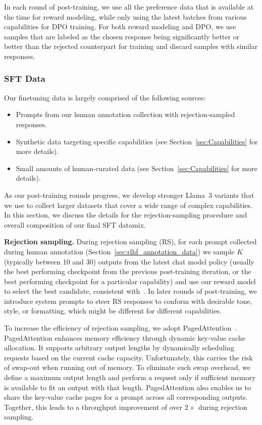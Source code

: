 In each round of post-training, we use all the preference data that is available at the time for reward modeling, while only using the latest batches from various capabilities for DPO training. For both reward modeling and DPO, we use samples that are labeled as the chosen response being significantly better or better than the rejected counterpart for training and discard samples with similar responses.

\subsubsection{SFT Data}
\label{subsubsec:sft_data} 

Our finetuning data is largely comprised of the following sources:

\begin{itemize}
    \item Prompts from our human annotation collection with rejection-sampled responses.
    \item Synthetic data targeting specific capabilities (see Section~\ref{sec:Capabilities} for more details).
    \item Small amounts of human-curated data (see Section~\ref{sec:Capabilities} for more details).
\end{itemize}

As our post-training rounds progress, we develop stronger Llama~3 variants that we use to collect larger datasets that cover a wide range of complex capabilities. In this section, we discuss the details for the rejection-sampling procedure and overall composition of our final SFT datamix.

\textbf{Rejection sampling.} During rejection sampling (RS), for each prompt collected during human annotation (Section~\ref{sec:rlhf_annotation_data}) we sample $K$ (typically between 10 and 30) outputs from the latest chat model policy (usually the best performing checkpoint from the previous post-training iteration, or the best performing checkpoint for a particular capability) and use our reward model to select the best candidate, consistent with~\citet{constitutional-ai-bai}. 
In later rounds of post-training, we introduce system prompts to steer RS responses to conform with desirable tone, style, or formatting, which might be different for different capabilities. 

To increase the efficiency of rejection sampling, we adopt PagedAttention~\citep{kwon2023efficient}. PagedAttention enhances memory efficiency through dynamic key-value cache allocation. It supports arbitrary output lengths by dynamically scheduling requests based on the current cache capacity. Unfortunately, this carries the risk of swap-out when running out of memory. To eliminate such swap overhead, we define a maximum output length and perform a request only if sufficient memory is available to fit an output with that length. PagedAttention also enables us to share the key-value cache pages for a prompt across all corresponding outputs. Together, this leads to a throughput improvement of over $2 \times$ during rejection sampling.

